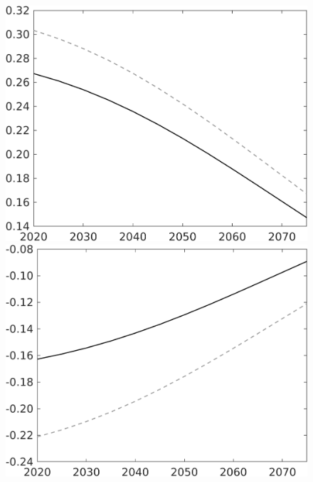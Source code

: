 \documentclass[12pt]{article}
\begin{document}
\begin{figure}[h!!]
\begin{minipage}[]{0.32\textwidth}
	\end{minipage}	
	\begin{minipage}[]{0.32\textwidth}
		\includegraphics[width=1\textwidth]{../../codding_model/own_basedOnFried/optimalPol_010922_revision/figures/all_13Sept22/PerdifNoTauf_Equlab_regime0_CompTaul_hh_spillover0_nsk0_xgr1_knspil1_sep1_LFlimit0_emsbase0_countec0_GovRev0_etaa0.79_lgd0.png}
	\end{minipage}	
	\begin{minipage}[]{0.32\textwidth}
	\includegraphics[width=1\textwidth]{../../codding_model/own_basedOnFried/optimalPol_010922_revision/figures/all_13Sept22/PerdifNoTauf_Equlab_regime0_CompTaul_hl_spillover0_nsk0_xgr1_knspil1_sep1_LFlimit0_emsbase0_countec0_GovRev0_etaa0.79_lgd0.png}

\end{minipage}
\end{figure}
\end{document}
